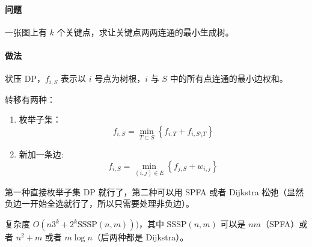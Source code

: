 \paragraph{问题} 一张图上有 $k$ 个关键点，求让关键点两两连通的最小生成树。

\paragraph{做法} 状压 DP，$f_{i,S}$ 表示以 $i$ 号点为树根，$i$ 与 $S$ 中的所有点连通的最小边权和。

转移有两种：

\begin{enumerate}
	\item 枚举子集：
	$$ f_{i, S} = \min_{T\subset S} \left\{f_{i, T} + f_{i, S\setminus T}\right\} $$
	\item 新加一条边: 
	$$ f_{i, S} = \min_{(i, j)\in E} \left\{f_{j, S} + w_{i, j}\right\} $$
\end{enumerate}

第一种直接枚举子集 DP 就行了，第二种可以用 SPFA 或者 Dijkstra 松弛（显然负边一开始全选就行了，所以只需要处理非负边）。

复杂度 $O(n 3^k + 2^k \text{SSSP}(n, m)))$，其中 $\text{SSSP}(n,m)$ 可以是 $nm$（SPFA）或者 $n^2+m$ 或者 $m\log n$（后两种都是 Dijkstra）。

\inputminted{cpp}{../src/graph/steiner.cpp}
